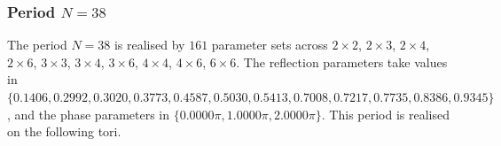 \par
\subsubsection{Period $N = 38$}
The period $N=38$ is realised by $161$ parameter sets across $2\times2$, $2\times3$, $2\times4$, $2\times6$, $3\times3$, $3\times4$, $3\times6$, $4\times4$, $4\times6$, $6\times6$. The reflection parameters take values in $\{0.1406, 0.2992, 0.3020, 0.3773, 0.4587, 0.5030, 0.5413, 0.7008, 0.7217, 0.7735, 0.8386, 0.9345\}$, and the phase parameters in $\{0.0000\pi, 1.0000\pi, 2.0000\pi\}$. This period is realised on the following tori.
